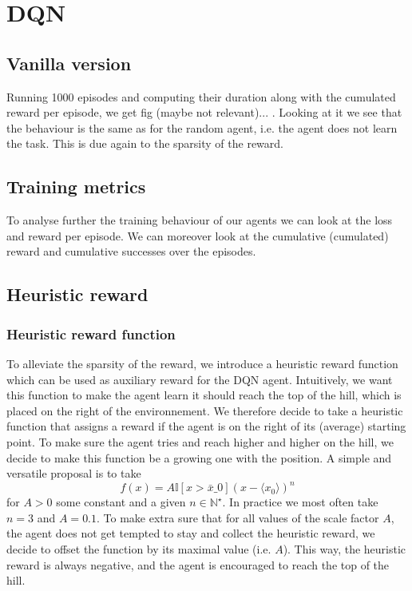 \documentclass[a4paper, 12pt,oneside]{article}
\begin{document}
    \section{DQN}
        \subsection{Vanilla version}
        Running 1000 episodes and computing their duration along with the cumulated reward per episode, we get fig (maybe not relevant)... . Looking at it we see that the behaviour is the same as for the random agent, i.e. the agent does not learn the task.
        This is due again to the sparsity of the reward. 
        \subsection{Training metrics}
        To analyse further the training behaviour of our agents we can look at the loss and reward per episode. We can moreover look at the cumulative (cumulated) reward and cumulative successes over the episodes. 
        \subsection{Heuristic reward}
        \subsubsection{Heuristic reward function}
        To alleviate the sparsity of the reward, we introduce a heuristic reward function which can be used as auxiliary reward for the DQN agent. Intuitively, we want this function to make the agent learn it should reach the top of the hill, which is placed on the right of the environnement. We therefore decide to take a heuristic function that assigns a reward if the agent is on the right of its (average) starting point. To make sure the agent tries and reach higher and higher on the hill, we decide to make this function be a growing one with the position. A simple and versatile proposal is to take 
        $$
        f(x) = A\mathbb I[x>\bar x\_0](x-\langle{x_0}\rangle)^n
        $$
        for $A>0$ some constant and a given $n\in\mathbb N^\star$. In practice we most often take $n=3$ and $A=0.1$. To make extra sure that for all values of the scale factor $A$, the agent does not get tempted to stay and collect the heuristic reward, we decide to offset the function by its maximal value (i.e. $A$). This way, the heuristic reward is always negative, and the agent is encouraged to reach the top of the hill.
\end{document}
